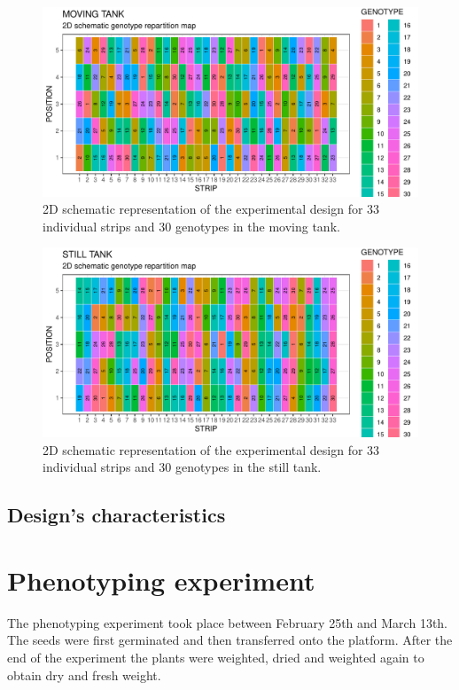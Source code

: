 \begin{figure}
    \includegraphics[width=\textwidth]{../../Figures/design_layout_moving.pdf} 
    \caption{2D schematic representation of the experimental design for 33 individual strips and 30 genotypes in the moving 
    tank.}
    \label{fig:moving_layout_30_geno}
\end{figure}

\begin{figure}
    \includegraphics[width=\textwidth]{../../Figures/design_layout_still.pdf} 
    \caption{2D schematic representation of the experimental design for 33 individual strips and 30 genotypes in the still 
    tank.}
    \label{fig:still_layout_30_geno}
\end{figure}

\subsection{Design's characteristics}


\section{Phenotyping experiment}
The phenotyping experiment took place between February 25th and March 13th. The seeds were first germinated and then transferred 
onto the platform. After the end of the experiment the plants were weighted, dried and weighted again to obtain dry and fresh 
weight.

